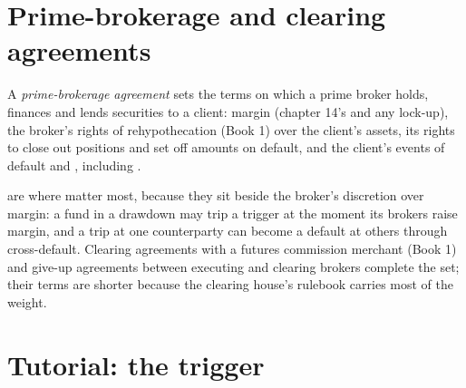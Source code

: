 \section{Prime-brokerage and clearing agreements}

\begin{definition}\label{def:fm:legal-documentation:pba}
A \emph{prime-brokerage agreement} sets the terms on which a prime broker holds, finances and lends securities to a
client: margin (chapter 14's  and any lock-up), the broker's rights of rehypothecation (Book 1) over the client's assets, its rights to
close out positions and set off amounts on default, and the client's events of default and , including .
\end{definition}

 are where  matter most, because they sit beside the broker's discretion over margin: a fund in a drawdown
may trip a trigger at the moment its brokers raise margin, and a trip at one counterparty can become a default at others through cross-default.
Clearing agreements with a futures commission merchant (Book 1) and give-up agreements between executing and clearing brokers complete the set;
their terms are shorter because the clearing house's rulebook carries most of the weight.

\section{Tutorial: the trigger}\label{tut:fm:legal-documentation:tut}

